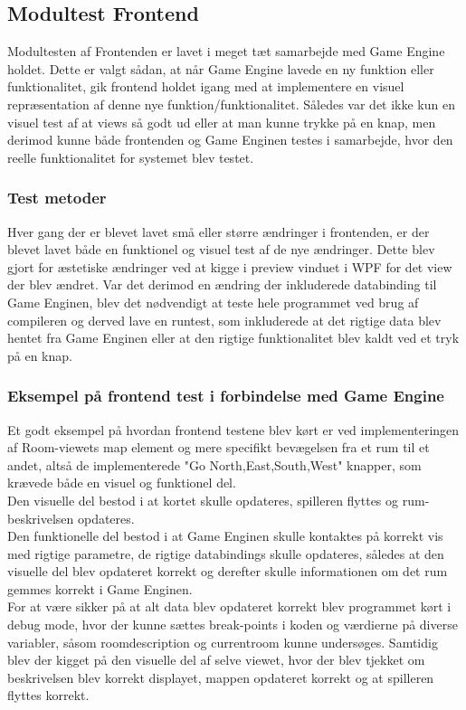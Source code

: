 \subsection{Modultest Frontend}
Modultesten af Frontenden er lavet i meget tæt samarbejde med Game Engine holdet. Dette er valgt sådan, at når Game Engine lavede en ny funktion eller funktionalitet, gik frontend holdet igang med at implementere en visuel repræsentation af denne nye funktion/funktionalitet. Således var det ikke kun en visuel test af at views så godt ud eller at man kunne trykke på en knap, men derimod kunne både frontenden og Game Enginen testes i samarbejde, hvor den reelle funktionalitet for systemet blev testet.

\subsubsection{Test metoder}
Hver gang der er blevet lavet små eller større ændringer i frontenden, er der blevet lavet både en funktionel og visuel test af de nye ændringer. Dette blev gjort for æstetiske ændringer ved at kigge i preview vinduet i WPF for det view der blev ændret. Var det derimod en ændring der inkluderede databinding til Game Enginen, blev det nødvendigt at teste hele programmet ved brug af compileren og derved lave en runtest, som inkluderede at det rigtige data blev hentet fra Game Enginen eller at den rigtige funktionalitet blev kaldt ved et tryk på en knap.

\subsubsection{Eksempel på frontend test i forbindelse med Game Engine}
Et godt eksempel på hvordan frontend testene blev kørt er ved implementeringen af Room-viewets map element og mere specifikt bevægelsen fra et rum til et andet, altså de implementerede "Go North,East,South,West" knapper, som krævede både en visuel og funktionel del.\\
Den visuelle del bestod i at kortet skulle opdateres, spilleren flyttes og rum-beskrivelsen opdateres.\\
Den funktionelle del bestod i at Game Enginen skulle kontaktes på korrekt vis med rigtige parametre, de rigtige databindings skulle opdateres, således at den visuelle del blev opdateret korrekt og derefter skulle informationen om det rum gemmes korrekt i Game Enginen.\\
For at være sikker på at alt data blev opdateret korrekt blev programmet kørt i debug mode, hvor der kunne sættes break-points i koden og værdierne på diverse variabler, såsom roomdescription og currentroom kunne undersøges. Samtidig blev der kigget på den visuelle del af selve viewet, hvor der blev tjekket om beskrivelsen blev korrekt displayet, mappen opdateret korrekt og at spilleren flyttes korrekt.
